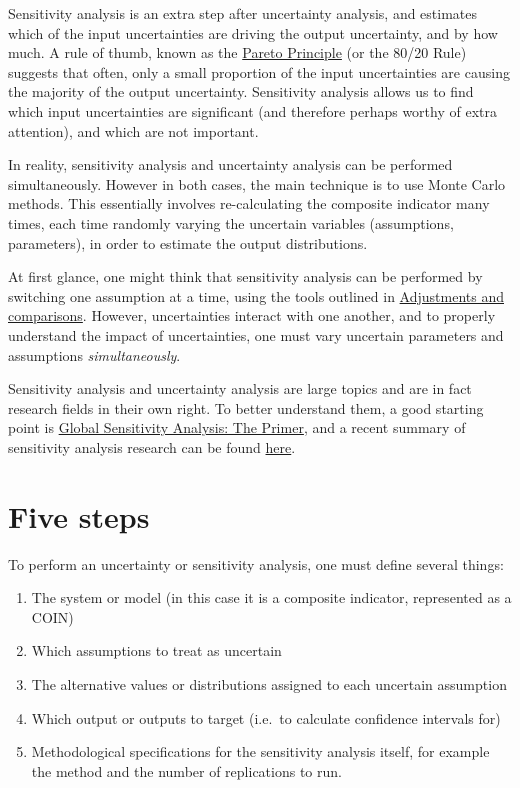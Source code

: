 \documentclass[
]{book}
\providecommand{\tightlist}{%
  \setlength{\itemsep}{0pt}\setlength{\parskip}{0pt}}
\begin{document}
Sensitivity analysis is an extra step after uncertainty analysis, and estimates which of the input uncertainties are driving the output uncertainty, and by how much. A rule of thumb, known as the \href{https://en.wikipedia.org/wiki/Pareto_principle}{Pareto Principle} (or the 80/20 Rule) suggests that often, only a small proportion of the input uncertainties are causing the majority of the output uncertainty. Sensitivity analysis allows us to find which input uncertainties are significant (and therefore perhaps worthy of extra attention), and which are not important.

In reality, sensitivity analysis and uncertainty analysis can be performed simultaneously. However in both cases, the main technique is to use Monte Carlo methods. This essentially involves re-calculating the composite indicator many times, each time randomly varying the uncertain variables (assumptions, parameters), in order to estimate the output distributions.

At first glance, one might think that sensitivity analysis can be performed by switching one assumption at a time, using the tools outlined in \protect\hyperlink{adjustments-and-comparisons}{Adjustments and comparisons}. However, uncertainties interact with one another, and to properly understand the impact of uncertainties, one must vary uncertain parameters and assumptions \emph{simultaneously}.

Sensitivity analysis and uncertainty analysis are large topics and are in fact research fields in their own right. To better understand them, a good starting point is \href{https://onlinelibrary.wiley.com/doi/book/10.1002/9780470725184}{Global Sensitivity Analysis: The Primer}, and a recent summary of sensitivity analysis research can be found \href{https://www.sciencedirect.com/science/article/pii/S1364815220310112?via\%3Dihub}{here}.

\hypertarget{five-steps}{%
\section{Five steps}\label{five-steps}}

To perform an uncertainty or sensitivity analysis, one must define several things:

\begin{enumerate}
\def\labelenumi{\arabic{enumi}.}
\tightlist
\item
  The system or model (in this case it is a composite indicator, represented as a COIN)
\item
  Which assumptions to treat as uncertain
\item
  The alternative values or distributions assigned to each uncertain assumption
\item
  Which output or outputs to target (i.e.~to calculate confidence intervals for)
\item
  Methodological specifications for the sensitivity analysis itself, for example the method and the number of replications to run.
\end{enumerate}
\end{document}
